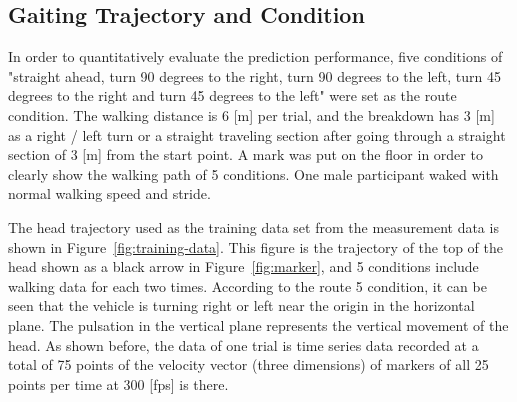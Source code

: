\documentclass{sigchi}
\begin{document}
\subsection{Gaiting Trajectory and Condition}

In order to quantitatively evaluate the prediction performance, five conditions of "straight ahead, turn 90 degrees to the right, turn 90 degrees to the left, turn 45 degrees to the right and turn 45 degrees to the left" were set as the route condition. The walking distance is 6 [m] per trial, and the breakdown has 3 [m] as a right / left turn or a straight traveling section after going through a straight section of 3 [m] from the start point. A mark was put on the floor  in order to clearly show the walking path of 5 conditions. One male participant waked with normal walking speed and stride.

The head trajectory used as the training data set from the measurement data is shown in Figure~\ref{fig:training-data}. This figure is the trajectory of the top of the head shown as a black arrow in Figure~\ref{fig:marker}, and 5 conditions include walking data for each two times. According to the route 5 condition, it can be seen that the vehicle is turning right or left near the origin in the horizontal plane. The pulsation in the vertical plane represents the vertical movement of the head. As shown before, the data of one trial is time series data recorded at a total of 75 points of the velocity vector (three dimensions) of markers of all 25 points per time at 300 [fps] is there.
\end{document}
